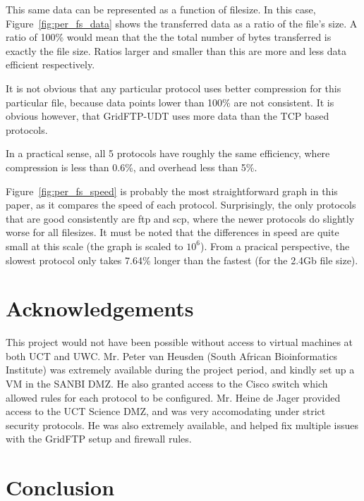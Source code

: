 \documentclass{sig-alternate-05-2015}
\begin{document}
This same data can be represented as a function of filesize. In this case, Figure~\ref{fig:per_fs_data} shows the transferred data as a ratio of the file's size. A ratio of 100\% would mean that the the total number of bytes transferred is exactly the file size. Ratios larger and smaller than this are more and less data efficient respectively.

It is not obvious that any particular protocol uses better compression for this particular file, because data points lower than 100\% are not consistent. It is obvious however, that GridFTP-UDT uses more data than the TCP based protocols.

In a practical sense, all 5 protocols have roughly the same efficiency, where compression is less than 0.6\%, and overhead less than 5\%.

Figure~\ref{fig:per_fs_speed} is probably the most straightforward graph in this paper, as it compares the speed of each protocol. Surprisingly, the only protocols that are good consistently are ftp and scp, where the newer protocols do slightly worse for all filesizes. It must be noted that the differences in speed are quite small at this scale (the graph is scaled to $10^6$). From a pracical perspective, the slowest protocol only takes 7.64\% longer than the fastest (for the 2.4Gb file size).

\section{Acknowledgements}
This project would not have been possible without access to virtual machines at both UCT and UWC. Mr. Peter van Heusden (South African Bioinformatics Institute) was extremely available during the project period, and kindly set up a VM in the SANBI DMZ. He also granted access to the Cisco switch which allowed rules for each protocol to be configured. Mr. Heine de Jager provided access to the UCT Science DMZ, and was very accomodating under strict security protocols. He was also extremely available, and helped fix multiple issues with the GridFTP setup and firewall rules.

\section{Conclusion}



\end{document}
